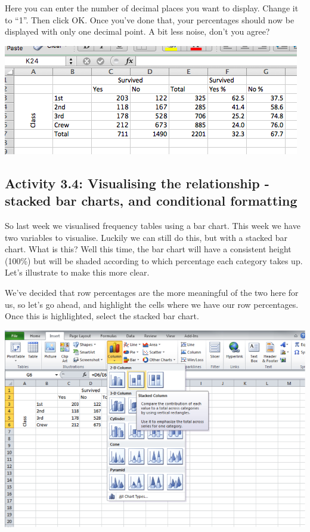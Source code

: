 \documentclass[
]{book}
\begin{document}
Here you can enter the number of decimal places you want to display. Change it to ``1''. Then click OK. Once you've done that, your percentages should now be displayed with only one decimal point. A bit less noise, don't you agree?

\includegraphics{imgs/one_dec_row_perc.png}

\hypertarget{activity-3.4-visualising-the-relationship---stacked-bar-charts-and-conditional-formatting}{%
\subsection{Activity 3.4: Visualising the relationship - stacked bar charts, and conditional formatting}\label{activity-3.4-visualising-the-relationship---stacked-bar-charts-and-conditional-formatting}}

So last week we visualised frequency tables using a bar chart. This week we have two variables to visualise. Luckily we can still do this, but with a stacked bar chart. What is this? Well this time, the bar chart will have a consistent height (100\%) but will be shaded according to which percentage each category takes up. Let's illustrate to make this more clear.

We've decided that row percentages are the more meaningful of the two here for us, so let's go ahead, and highlight the cells where we have our row percentages. Once this is highlighted, select the stacked bar chart.

\includegraphics{imgs/stacked_col.png}
\end{document}
